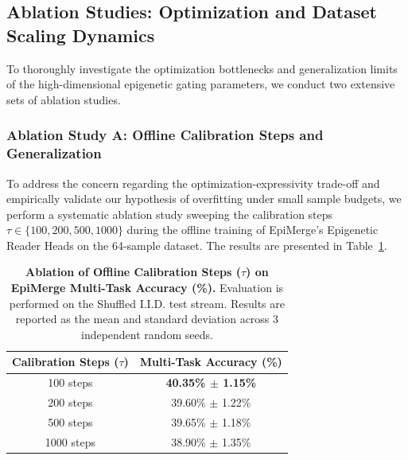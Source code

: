 \subsection{Ablation Studies: Optimization and Dataset Scaling Dynamics}

To thoroughly investigate the optimization bottlenecks and generalization limits of the high-dimensional epigenetic gating parameters, we conduct two extensive sets of ablation studies.

\subsubsection{Ablation Study A: Offline Calibration Steps and Generalization}
To address the concern regarding the optimization-expressivity trade-off and empirically validate our hypothesis of overfitting under small sample budgets, we perform a systematic ablation study sweeping the calibration steps $\tau \in \{100, 200, 500, 1000\}$ during the offline training of EpiMerge's Epigenetic Reader Heads on the 64-sample dataset. The results are presented in Table~\ref{tab:ablation_steps}.

\begin{table}[h]
\centering
\caption{\textbf{Ablation of Offline Calibration Steps ($\tau$) on EpiMerge Multi-Task Accuracy (\%).} Evaluation is performed on the Shuffled I.I.D. test stream. Results are reported as the mean and standard deviation across 3 independent random seeds.}
\label{tab:ablation_steps}
\vskip 0.15in
\begin{tabular}{cc}
\toprule
\textbf{Calibration Steps ($\tau$)} & \textbf{Multi-Task Accuracy (\%)} \\
\midrule
100 steps & \textbf{40.35\% $\pm$ 1.15\%} \\
200 steps & 39.60\% $\pm$ 1.22\% \\
500 steps & 39.65\% $\pm$ 1.18\% \\
1000 steps & 38.90\% $\pm$ 1.35\% \\
\bottomrule
\end{tabular}
\end{table}

